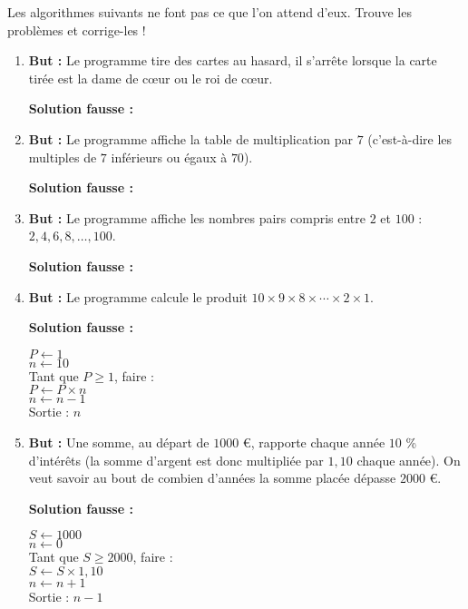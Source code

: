 \documentclass[class=report,crop=false, 12pt]{standalone}
\begin{document}
\begin{activite}
Les algorithmes suivants ne font pas ce que l'on attend d'eux. Trouve les problèmes et corrige-les !

\begin{enumerate}
  \item \textbf{But :} Le programme tire des cartes au hasard, il s'arrête lorsque la carte tirée est la dame de c\oe ur ou le roi de c\oe ur.
    
    \textbf{Solution fausse :}
 
  \item \textbf{But :} Le programme affiche la table de multiplication par $7$ (c'est-à-dire les multiples de $7$ inférieurs ou égaux à $70$).
  
    \textbf{Solution fausse :}  
  
  \item \textbf{But :} Le programme affiche les nombres pairs compris entre $2$ et $100$ : $2,4,6,8,\ldots, 100$.

    \textbf{Solution fausse :}
   
  \item \textbf{But :} Le programme calcule le produit $10 \times 9 \times 8 \times \cdots \times 2 \times 1$.
  
      \textbf{Solution fausse :}
\begin{center}
\begin{minipage}{0.4\textwidth}
$P \leftarrow 1$\\
$n \leftarrow 10$\\
Tant que $P \ge 1$, faire :\\
\indentation $P \leftarrow P \times n$\\
\indentation $n \leftarrow n-1$\\
Sortie : $n$
\end{minipage}
\end{center}    
  
  \item \textbf{But :} Une somme, au départ de $1000$ €, rapporte chaque année $10$ \% d'intérêts (la somme d'argent est donc multipliée par $1,10$ chaque année). On veut savoir au bout de combien d'années la somme placée dépasse $2000$ €.
  
     \textbf{Solution fausse :} 
\begin{center}
\begin{minipage}{0.4\textwidth}
$S \leftarrow 1000$\\
$n \leftarrow 0$\\
Tant que $S \ge 2000$, faire :\\
\indentation $S \leftarrow S \times 1,10$\\
\indentation $n \leftarrow n+1$\\
Sortie : $n-1$
\end{minipage}
\end{center}  
  
\end{enumerate}
\end{activite}
\end{document}
